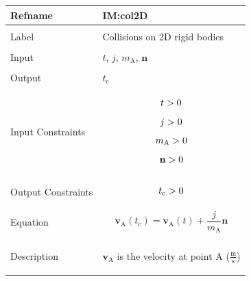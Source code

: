 \documentclass[12pt]{article}
\newcommand{\gt}{\ensuremath >}
\begin{document}
\begin{minipage}{\textwidth}
\begin{tabular}{>{\raggedright}p{}>{\raggedright\arraybackslash}p{}}
\toprule \textbf{Refname} & \textbf{IM:col2D}
\label{IM:col2D}
\\ \midrule \\
Label & Collisions on 2D rigid bodies
        
\\ \midrule \\
Input & $t$, $j$, ${m_{\text{A}}}$, $\mathbf{n}$
        
\\ \midrule \\
Output & ${t_{\text{c}}}$
         
\\ \midrule \\
Input Constraints & \begin{displaymath}
                    t\gt{}0
                    \end{displaymath}
                    \begin{displaymath}
                    j\gt{}0
                    \end{displaymath}
                    \begin{displaymath}
                    {m_{\text{A}}}\gt{}0
                    \end{displaymath}
                    \begin{displaymath}
                    \mathbf{n}\gt{}0
                    \end{displaymath}
\\ \midrule \\
Output Constraints & \begin{displaymath}
                     {t_{\text{c}}}\gt{}0
                     \end{displaymath}
\\ \midrule \\
Equation & \begin{displaymath}
           {\mathbf{v}_{\text{A}}}\left({t_{\text{c}}}\right)={\mathbf{v}_{\text{A}}}\left(t\right)+\frac{j}{{m_{\text{A}}}} \mathbf{n}
           \end{displaymath}
\\ \midrule \\
Description & \begin{symbDescription}
              \item{${\mathbf{v}_{\text{A}}}$ is the velocity at point A ($\frac{\text{m}}{\text{s}}$)}

\end{symbDescription}
\end{tabular}
\end{minipage}
\end{document}
